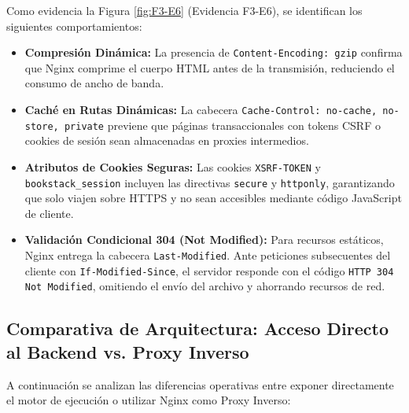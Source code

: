 \documentclass[12pt,a4paper]{article}
\begin{document}
Como evidencia la Figura \ref{fig:F3-E6} (Evidencia F3-E6), se identifican los siguientes comportamientos:
\begin{itemize}
    \item \textbf{Compresión Dinámica:} La presencia de \texttt{Content-Encoding: gzip} confirma que Nginx comprime el cuerpo HTML antes de la transmisión, reduciendo el consumo de ancho de banda.
    \item \textbf{Caché en Rutas Dinámicas:} La cabecera \texttt{Cache-Control: no-cache, no-store, private} previene que páginas transaccionales con tokens CSRF o cookies de sesión sean almacenadas en proxies intermedios.
    \item \textbf{Atributos de Cookies Seguras:} Las cookies \texttt{XSRF-TOKEN} y \texttt{bookstack\_session} incluyen las directivas \texttt{secure} y \texttt{httponly}, garantizando que solo viajen sobre HTTPS y no sean accesibles mediante código JavaScript de cliente.
    \item \textbf{Validación Condicional 304 (Not Modified):} Para recursos estáticos, Nginx entrega la cabecera \texttt{Last-Modified}. Ante peticiones subsecuentes del cliente con \texttt{If-Modified-Since}, el servidor responde con el código \texttt{HTTP 304 Not Modified}, omitiendo el envío del archivo y ahorrando recursos de red.
\end{itemize}

\subsection{Comparativa de Arquitectura: Acceso Directo al Backend vs. Proxy Inverso}

A continuación se analizan las diferencias operativas entre exponer directamente el motor de ejecución o utilizar Nginx como Proxy Inverso:
\end{document}
